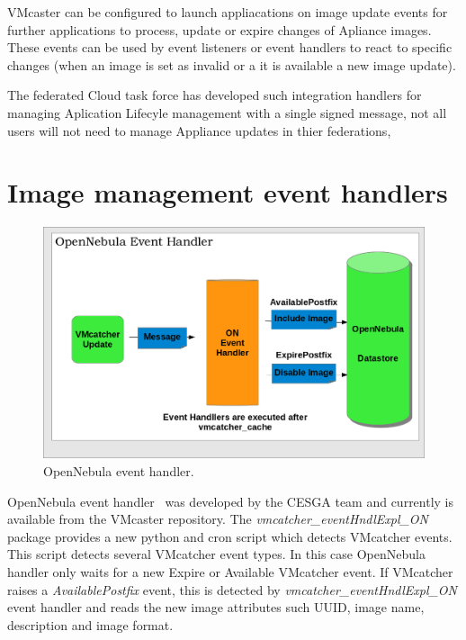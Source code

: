 \documentclass{llncs_Ibergrid2013}
\begin{document}
VMcaster can be configured to launch appliacations on image update events for further applications to process, update or expire changes of Apliance images.  These events can be used by event listeners or event handlers to react to specific changes (when an image is set as invalid or a it is available a new image update). 

The federated Cloud task force has developed such integration handlers for managing Aplication Lifecyle management with a single signed message, not all users will not need to manage Appliance updates in thier federations,

\section{Image management event handlers}
\label{sect-handlers}
\begin{figure}[h]
\centering
\includegraphics[width=1\textwidth]{ONeventhandler.png}
\caption{OpenNebula event handler.}
\label{fig:onevent}
\end{figure}
OpenNebula event handler~\cite{onevent} was developed by the CESGA team and currently is available from the VMcaster repository. 
The \textit{vmcatcher\_eventHndlExpl\_ON} package provides a new python and cron script which detects VMcatcher events. 
This script detects several VMcatcher event types. In this case OpenNebula handler only waits for a new Expire or Available VMcatcher event.
If VMcatcher raises a \textit{AvailablePostfix} event, this is detected by \textit{vmcatcher\_eventHndlExpl\_ON} event handler and reads the new image attributes such UUID, image name, description and image format.
\end{document}
